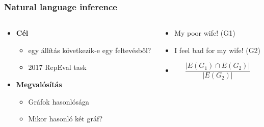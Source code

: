 \documentclass[bigger]{beamer}
\begin{document}
\begin{frame}
\frametitle{Natural language inference}
\begin{columns}
\begin{column}{0.5\textwidth}
\begin{itemize}
\pause \item \textbf{Cél}
\begin{itemize}
	\item egy állítás következik-e egy feltevésből?
	\item 2017 RepEval task
\end{itemize}
\pause \item \textbf{Megvalósítás}
\begin{itemize}
	\item Gráfok hasonlósága
	\item Mikor hasonló két gráf?
\end{itemize}
\end{itemize}
\end{column}
\begin{column}{0.5\textwidth}
\begin{itemize}
\pause \item My poor wife! (G1)
\pause \item I feel bad for my wife! (G2)
\pause \item \[\frac{|E(G_1)\cap E(G_2)|}{|E(G_2)|}\]			
\end{itemize}
\end{column}
\end{columns}

\end{frame}
\end{document}
